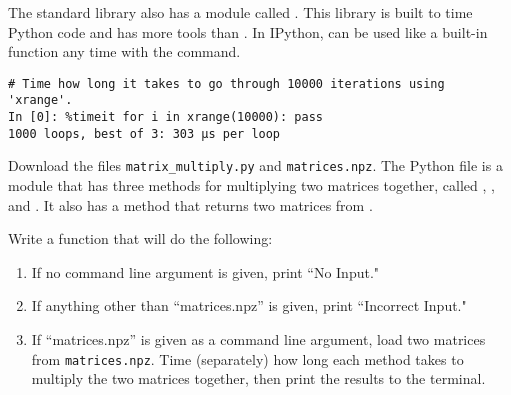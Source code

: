 The standard library also has a module called .
This library is built to time Python code and has more tools than 
.
In IPython,  can be used like a built-in function any time with the  command.

\begin{lstlisting}
# Time how long it takes to go through 10000 iterations using 'xrange'.
In [0]: %timeit for i in xrange(10000): pass 
1000 loops, best of 3: 303 µs per loop
\end{lstlisting}

\begin{problem}
Download the files \texttt{matrix\_multiply.py} and \texttt{matrices.npz}.
The Python file  is a module that has three methods for multiplying two matrices together, called , , and .
It also has a  method that returns two matrices from .

Write a function that will do the following:
\begin{enumerate}
\item If no command line argument is given, print ``No Input."
\item If anything other than ``matrices.npz'' is given, print ``Incorrect Input."
\item If ``matrices.npz'' is given as a command line argument, load two matrices from \texttt{matrices.npz}. Time (separately) how long each method takes to multiply the two matrices together, then print the results to the terminal.
\end{enumerate}
\end{problem}
